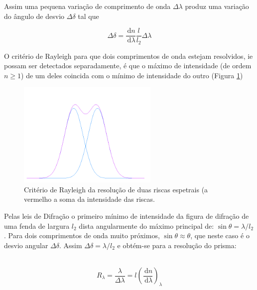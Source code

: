 \documentclass[a4paper,12pt]{article}  %
\newcommand{\ud}{\,\mathrm{d}}
\begin{document}
Assim uma pequena variação de comprimento de onda $\Delta \lambda$ produz uma variação do ângulo de desvio $\Delta \delta$  tal que 

\begin{equation}
	\label{eq:Delt_delta}
	\Delta \delta =  \frac{\ud n}{\ud \lambda} \frac{l}{l_2} \Delta \lambda 
\end{equation}

O critério de Rayleigh para que dois comprimentos de onda estejam resolvidos, ie possam ser detectados separadamente, é que o máximo de intensidade (de ordem $n \ge 1$) de um deles coincida com o mínimo de intensidade do outro (Figura \ref{fig:gauss})

\begin{figure}[ht]  \centering 
	\includegraphics[width=0.6\textwidth]{gauss}
	\caption{Critério de Rayleigh da resolução de duas riscas espetrais (a vermelho a soma da intensidade das riscas. \label{fig:gauss}} 
\end{figure}

Pelas leis de Difração o primeiro mínimo de intensidade da figura de difração de uma fenda de largura $l_2$ dista angularmente do máximo principal de:  $\sin \theta = \lambda/l_2$.
Para dois comprimentos de onda muito próximos, $\sin  \theta \approx \theta $, que neste caso é o desvio angular $\Delta \delta$. Assim $\Delta \delta= \lambda / l_2$ e obtém-se para a resolução do prisma: 

~\begin{equation}
	\label{eq:resolup}
	R_\lambda  =  \frac{\lambda}{\Delta \lambda} = l \left(\frac{\ud n}{\ud \lambda} \right )_\lambda 
\end{equation}
\end{document}
